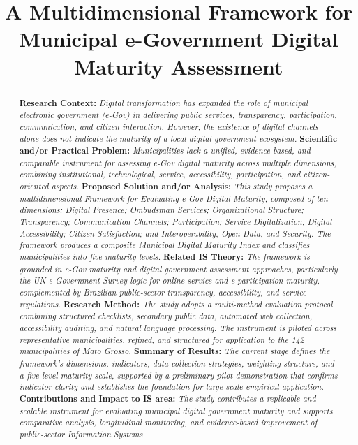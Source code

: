 \documentclass[12pt]{article}
\title{A Multidimensional Framework for Municipal e-Government Digital Maturity Assessment}
\begin{document}
 

\maketitle

\begin{abstract}
 \textbf{Research Context:}
 \textit{Digital transformation has expanded the role of municipal electronic government (e-Gov) in delivering public services, transparency, participation, communication, and citizen interaction. However, the existence of digital channels alone does not indicate the maturity of a local digital government ecosystem.}
 \textbf{Scientific and/or Practical Problem:}  
 \textit{Municipalities lack a unified, evidence-based, and comparable instrument for assessing e-Gov digital maturity across multiple dimensions, combining institutional, technological, service, accessibility, participation, and citizen-oriented aspects.}
 \textbf{Proposed Solution and/or Analysis:}  
 \textit{This study proposes a multidimensional Framework for Evaluating e-Gov Digital Maturity, composed of ten dimensions: Digital Presence; Ombudsman Services; Organizational Structure; Transparency; Communication Channels; Participation; Service Digitalization; Digital Accessibility; Citizen Satisfaction; and Interoperability, Open Data, and Security. The framework produces a composite Municipal Digital Maturity Index and classifies municipalities into five maturity levels.}
 \textbf{Related IS Theory: }  
 \textit{The framework is grounded in e-Gov maturity and digital government assessment approaches, particularly the UN e-Government Survey logic for online service and e-participation maturity, complemented by Brazilian public-sector transparency, accessibility, and service regulations.}
 \textbf{Research Method:} 
 \textit{The study adopts a multi-method evaluation protocol combining structured checklists, secondary public data, automated web collection, accessibility auditing, and natural language processing. The instrument is piloted across representative municipalities, refined, and structured for application to the 142 municipalities of Mato Grosso.}
 \textbf{Summary of Results:} 
 \textit{The current stage defines the framework's dimensions, indicators, data collection strategies, weighting structure, and a five-level maturity scale, supported by a preliminary pilot demonstration that confirms indicator clarity and establishes the foundation for large-scale empirical application.}
 \textbf{Contributions and Impact to IS area:} 
 \textit{The study contributes a replicable and scalable instrument for evaluating municipal digital government maturity and supports comparative analysis, longitudinal monitoring, and evidence-based improvement of public-sector Information Systems.}
 
\end{abstract}
     
\end{document}

